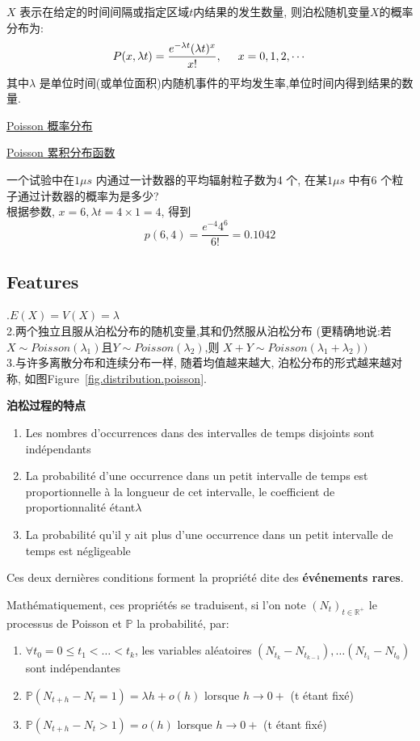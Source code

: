 \documentclass{article}
\begin{document}
\bigskip
$X$ 表示在给定的时间间隔或指定区域$t$内结果的发生数量, 则泊松随机变量$X$的概率分布为:
$$
P(x,\lambda t)={\frac  {e^{-\lambda t}(\lambda t) ^{x}}{x!}}, \hspace{0.5cm} x=0,1,2,\cdots
$$
其中$\lambda$ 是单位时间(或单位面积)内随机事件的平均发生率,单位时间内得到结果的数量.

\href{http://upload.wikimedia.org/wikipedia/commons/thumb/c/c1/Poisson\_distribution\_PMF.png/325px-Poisson\_distribution\_PMF.png}{Poisson 概率分布}\label{fig.distribution.poisson}

\href{http://upload.wikimedia.org/wikipedia/commons/thumb/8/84/Poisson\_distribution\_CMF.png/325px-Poisson\_distribution\_CMF.png}{Poisson 累积分布函数}\label{fig.distribution.poisson.pmf}

\begin{example}
一个试验中在$1 \mu s$ 内通过一计数器的平均辐射粒子数为4 个, 在某$1\mu s$ 中有6 个粒子通过计数器的概率为是多少?\\
根据参数, $x=6, \lambda t = 4 \times 1=4$, 得到
$$ p(6,4) = \frac{e^{-4} 4^6}{6!} = 0.1042 $$
\end{example}

\subsection{Features}	
.$E(X)=V(X)=\lambda$ \\
2.两个独立且服从泊松分布的随机变量,其和仍然服从泊松分布 (更精确地说:若$X \sim Poisson(\lambda_1)$且$Y \sim Poisson(\lambda_2)$,则 $X+Y \sim Poisson(\lambda_1+\lambda_2))$\\
3.与许多离散分布和连续分布一样, 随着均值越来越大, 泊松分布的形式越来越对称, 如图Figure~\ref{fig.distribution.poisson}.

\textbf{泊松过程的特点}
\begin{enumerate}
\item Les nombres d'occurrences dans des intervalles de temps disjoints sont ind\'ependants
\item La probabilit\'e d'une occurrence dans un petit intervalle de temps est proportionnelle \`a la longueur de cet intervalle, le coefficient de proportionnalit\'e \'etant$ \lambda$
\item La probabilit\'e qu'il y ait plus d'une occurrence dans un petit intervalle de temps est n\'egligeable
\end{enumerate}
Ces deux derni\`eres conditions forment la propri\'et\'e dite des \textbf{\'ev\'enements rares}.

Math\'ematiquement, ces propri\'et\'es se traduisent, si l'on note $(N_{t})_{{t\in {\mathbb  {R}}^{+}}}$ le processus de Poisson et ${\mathbb  {P}}$ la probabilit\'e, par:
\begin{enumerate}
\item $\forall t_{0}=0\leq t_{1}<\dots <t_{k}$, les variables al\'eatoires $(N_{{t_{k}}}-N_{{t_{{k-1}}}}),\dots (N_{{t_{1}}}-N_{{t_{0}}})$ sont ind\'ependantes
\item ${\mathbb{P}}(N_{{t+h}}-N_{t}=1)=\lambda h+o(h)$ lorsque $h\to 0+$ (t \'etant fix\'e)
\item ${\mathbb{P}}(N_{{t+h}}-N_{t}>1)=o(h)$ lorsque $h\to 0+$ (t \'etant fix\'e)
\end{enumerate}
\end{document}
